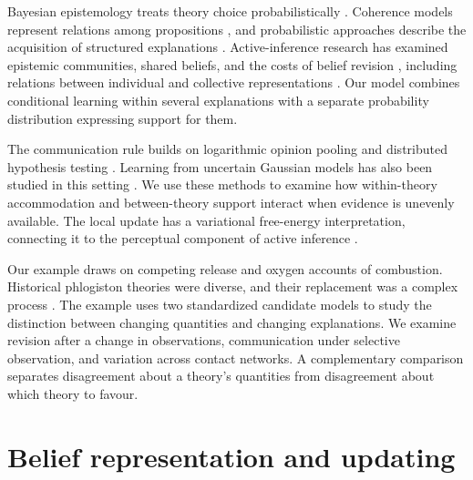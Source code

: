 \documentclass[runningheads]{llncs}
\begin{document}
Bayesian epistemology treats theory choice probabilistically \citep{bovens2003}.
Coherence models represent relations among propositions \citep{thagard1989,thagard1990},
and probabilistic approaches describe the acquisition of structured explanations
\citep{kemp2008form,ullman2020}. Active-inference research has examined epistemic
communities, shared beliefs, and the costs of belief revision
\citep{albarracin2022,friston2023federated,hyland2025}, including relations between
individual and collective representations \citep{catal2024,waade2025}. Our model
combines conditional learning within several explanations with a separate
probability distribution expressing support for them.

The communication rule builds on logarithmic opinion pooling
\citep{genest1986} and distributed hypothesis testing
\citep{jadbabaie2012,molavi2018,nedic2017,lalitha2018}. Learning from uncertain
Gaussian models has also been studied in this setting \citep{hare2019gaussian}.
We use these methods to examine how within-theory accommodation and between-theory
support interact when evidence is unevenly available. The local update has a
variational free-energy interpretation, connecting it to the perceptual component
of active inference \citep{friston2017process,dacosta2020}.

Our example draws on competing release and oxygen accounts of combustion.
Historical phlogiston theories were diverse, and their replacement was a complex
process \citep{blumenthal2017,holmes2000,boantza2011}. The example uses two
standardized candidate models to study the distinction between changing quantities
and changing explanations. We examine revision after a change in observations,
communication under selective observation, and variation across contact networks.
A complementary comparison separates disagreement about a theory's quantities
from disagreement about which theory to favour.

\section{Belief representation and updating}
\label{sec:model}
\end{document}
